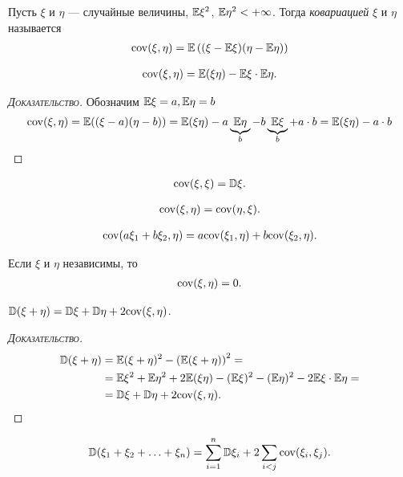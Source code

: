 \documentclass[../main.tex]{subfiles}
\begin{document}
\begin{df}[ковариация]
 Пусть $ \xi $ и $ \eta $ --- случайные величины, $ \mathbb E\xi^{2} $, $ \mathbb E\eta^{2} < +\infty$. Тогда \textit{ковариацией} $ \xi $ и $ \eta $ называется
 \begin{align*}
  \mathrm{cov}(\xi,\eta) = \mathbb E \left( (\xi - \mathbb E\xi)(\eta - \mathbb E\eta) \right)
 \end{align*} 
\end{df}
\begin{prop}
 \begin{align*}
  \mathrm{cov}(\xi,\eta) = \mathbb E(\xi\eta) - \mathbb E\xi \cdot \mathbb E\eta.
 \end{align*} 
\end{prop}
\begin{proof}[\normalfont\textsc{Доказательство}]
	Обозначим $\mathbb E \xi = a, \mathbb E \eta = b$ 
	\begin{align*}
		\mathrm{cov}(\xi, \eta) = \mathbb E((\xi - a)(\eta - b)) = \mathbb E(\xi \eta) - a\underbrace{\mathbb E\eta}_b -b\underbrace{\mathbb E\xi}_b + a \cdot b = \mathbb E(\xi \eta) - a \cdot b
	\end{align*}
\end{proof}
\begin{prop}
 \begin{align*}
  \mathrm{cov}(\xi,\xi) = \mathbb D\xi.
 \end{align*} 
\end{prop}
\begin{prop}
 \begin{align*}
  \mathrm{cov}(\xi,\eta) = \mathrm{cov}(\eta,\xi).
 \end{align*}
\end{prop}
\begin{prop}
 \begin{align*}
  \mathrm{cov}(a\xi_1 + b\xi_2, \eta) = a\mathrm{cov}(\xi_1,\eta) + b \mathrm{cov}(\xi_2, \eta).
 \end{align*} 
\end{prop}
\begin{prop}
 Если $ \xi $ и $ \eta $ независимы, то
 \begin{align*}
  \mathrm{cov}(\xi,\eta) = 0.
 \end{align*} 
\end{prop}
\begin{prop}
 $ \mathbb D(\xi + \eta) = \mathbb D\xi + \mathbb D\eta + 2\mathrm{cov}(\xi,\eta) $.
\end{prop}
\begin{proof}[\normalfont\textsc{Доказательство}]
 \begin{align*}
  \mathbb D(\xi+\eta) &= \mathbb E(\xi+\eta)^{2} - \left( \mathbb E(\xi+\eta) \right)^{2} = \\
  &= \mathbb E\xi^{2} + \mathbb E\eta^{2} + 2\mathbb E(\xi\eta) - (\mathbb E\xi)^{2} - (\mathbb E\eta)^{2} - 2\mathbb E\xi \cdot \mathbb E\eta = \\
  &= \mathbb D\xi + \mathbb D\eta +2\mathrm{cov}(\xi,\eta).
 \end{align*} 
\end{proof}
\begin{prop}
 \begin{align*}
  \mathbb D(\xi_1 + \xi_2 + \ldots + \xi_n) = \sum_{i=1}^{n} \mathbb D\xi_i + 2 \sum_{i < j} \mathrm{cov}(\xi_i, \xi_j).
 \end{align*} 
\end{prop}
\end{document}
